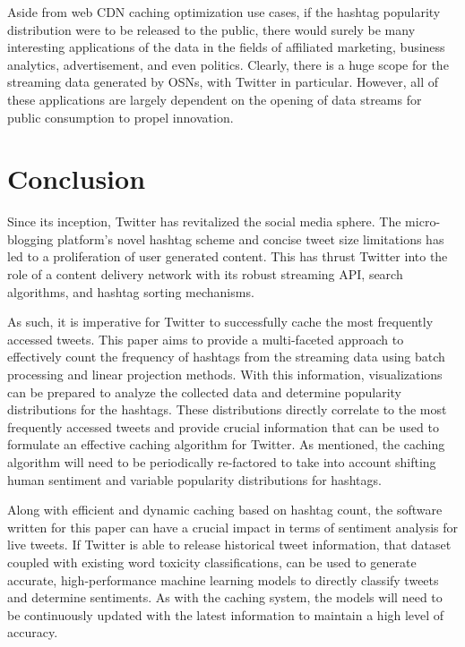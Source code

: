 \documentclass[conference]{IEEEtran}
\begin{document}
Aside from web CDN caching optimization use cases, if the hashtag popularity distribution were to be released to the public, there would surely be many interesting applications of the data in the fields of affiliated marketing, business analytics, advertisement, and even politics. Clearly, there is a huge scope for the streaming data generated by OSNs, with Twitter in particular. However, all of these applications are largely dependent on the opening of data streams for public consumption to propel innovation. \par

\section{Conclusion}
Since its inception, Twitter has revitalized the social media sphere. The micro-blogging platform's novel hashtag scheme and concise tweet size limitations has led to a proliferation of user generated content. This has thrust Twitter into the role of a content delivery network with its robust streaming API, search algorithms, and hashtag sorting mechanisms. \par

As such, it is imperative for Twitter to successfully cache the most frequently accessed tweets. This paper aims to provide a multi-faceted approach to effectively count the frequency of hashtags from the streaming data using batch processing and linear projection methods. With this information, visualizations can be prepared to analyze the collected data and determine popularity distributions for the hashtags. These distributions directly correlate to the most frequently accessed tweets and provide crucial information that can be used to formulate an effective caching algorithm for Twitter. As mentioned, the caching algorithm will need to be periodically re-factored to take into account shifting human sentiment and variable popularity distributions for hashtags. \par

Along with efficient and dynamic caching based on hashtag count, the software written for this paper can have a crucial impact in terms of sentiment analysis for live tweets. If Twitter is able to release historical tweet information, that dataset coupled with existing word toxicity classifications, can be used to generate accurate, high-performance machine learning models to directly classify tweets and determine sentiments. As with the caching system, the models will need to be continuously updated with the latest information to maintain a high level of accuracy. \par
\end{document}
